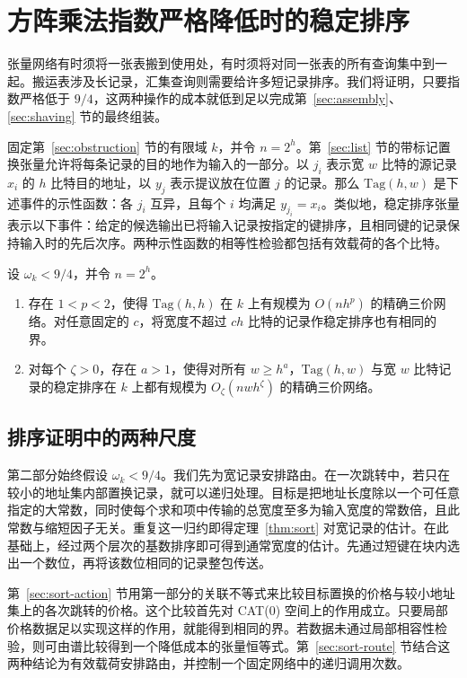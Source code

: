 \section{方阵乘法指数严格降低时的稳定排序}\label{sec:sorting}

张量网络有时须将一张表搬到使用处，有时须将对同一张表的所有查询集中到一起。搬运表涉及长记录，汇集查询则需要给许多短记录排序。我们将证明，只要指数严格低于 $9/4$，这两种操作的成本就低到足以完成第~\ref{sec:assembly}、\ref{sec:shaving} 节的最终组装。

固定第~\ref{sec:obstruction} 节的有限域 $k$，并令 $n=2^h$。第~\ref{sec:list} 节的带标记置换张量允许将每条记录的目的地作为输入的一部分。以 $j_i$ 表示宽 $w$ 比特的源记录 $x_i$ 的 $h$ 比特目的地址，以 $y_j$ 表示提议放在位置 $j$ 的记录。那么 $\mathrm{Tag}(h,w)$ 是下述事件的示性函数：各 $j_i$ 互异，且每个 $i$ 均满足 $y_{j_i}=x_i$。类似地，稳定排序张量表示以下事件：给定的候选输出已将输入记录按指定的键排序，且相同键的记录保持输入时的先后次序。两种示性函数的相等性检验都包括有效载荷的各个比特。

\begin{theorem}[条件稳定排序]\label{thm:sort} 设 $\omega_k<9/4$，并令 $n=2^h$。\begin{enumerate} \item 存在 $1<p<2$，使得 $\mathrm{Tag}(h,h)$ 在 $k$ 上有规模为 $O(nh^p)$ 的精确三价网络。对任意固定的 $c$，将宽度不超过 $ch$ 比特的记录作稳定排序也有相同的界。\item 对每个 $\zeta>0$，存在 $a>1$，使得对所有 $w\ge h^a$，$\mathrm{Tag}(h,w)$ 与宽 $w$ 比特记录的稳定排序在 $k$ 上都有规模为 $O_\zeta(nw h^\zeta)$ 的精确三价网络。\end{enumerate} \end{theorem}



\subsection{排序证明中的两种尺度}\label{sec:sort-road}

第二部分始终假设 $\omega_k<9/4$。我们先为宽记录安排路由。在一次跳转中，若只在较小的地址集内部置换记录，就可以递归处理。目标是把地址长度除以一个可任意指定的大常数，同时使每个求和项中传输的总宽度至多为输入宽度的常数倍，且此常数与缩短因子无关。重复这一归约即得定理~\ref{thm:sort} 对宽记录的估计。在此基础上，经过两个层次的基数排序即可得到通常宽度的估计。先通过短键在块内选出一个数位，再将该数位相同的记录整包传送。

第~\ref{sec:sort-action} 节用第一部分的关联不等式来比较目标置换的价格与较小地址集上的各次跳转的价格。这个比较首先对 CAT(0) 空间上的作用成立。只要局部价格数据足以实现这样的作用，就能得到相同的界。若数据未通过局部相容性检验，则可由谱比较得到一个降低成本的张量恒等式。第~\ref{sec:sort-route} 节结合这两种结论为有效载荷安排路由，并控制一个固定网络中的递归调用次数。

